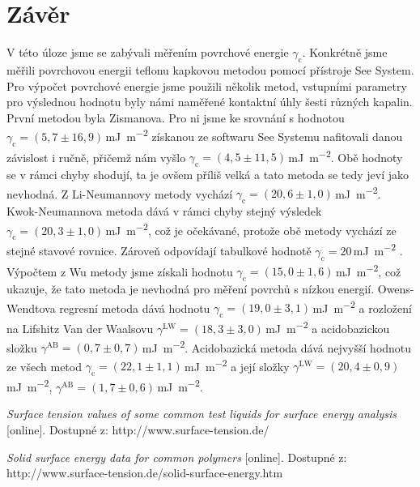 \documentclass{protokol}
\begin{document}
\section{Závěr}
V této úloze jsme se zabývali měřením povrchové energie  $\gamma_{\text{c}}$. 
Konkrétně jsme měřili povrchovou energii teflonu kapkovou metodou pomocí 
přístroje See System. Pro výpočet povrchové energie jsme použili několik metod, 
vstupními parametry pro výslednou hodnotu byly námi naměřené kontaktní úhly 
šesti různých kapalin. První metodou byla Zismanova. Pro ni jsme ke srovnání s 
hodnotou $\gamma_{\text{c}} = 
(5,7\pm16,9)$\,\si{\milli\joule\per\meter\squared} získanou ze softwaru See 
Systemu nafitovali danou závislost i ručně, přičemž nám vyšlo 
$\gamma_{\text{c}} = (4,5\pm11,5)$\,\si{\milli\joule\per\meter\squared}. Obě 
hodnoty se v rámci chyby shodují, ta je ovšem příliš velká a tato metoda se 
tedy jeví jako nevhodná. Z Li-Neumannovy metody vychází $\gamma_{\text{c}} = 
(20,6\pm1,0)$\,\si{\milli\joule\per\meter\squared}. Kwok-Neumannova metoda dává 
v rámci chyby stejný výsledek $\gamma_{\text{c}} = 
(20,3\pm1,0)$\,\si{\milli\joule\per\meter\squared}, což je očekávané, protože 
obě metody vychází ze stejné stavové rovnice. Zároveň odpovídají tabulkové 
hodnotě $\gamma_{\text{c}} = 20$\,\si{\milli\joule\per\meter\squared} 
\cite{napetiTeflon}. Výpočtem z Wu metody jsme získali hodnotu 
$\gamma_{\text{c}} = (15,0\pm1,6)$\,\si{\milli\joule\per\meter\squared}, což 
ukazuje, že tato metoda je nevhodná pro měření povrchů s nízkou energií. 
Owens-Wendtova regresní metoda dává hodnotu $\gamma_{\text{c}} = 
(19,0\pm3,1)$\,\si{\milli\joule\per\meter\squared} a rozložení na Lifshitz Van 
der Waalsovu $\gamma^\text{LW} = 
(18,3\pm3,0)$\,\si{\milli\joule\per\meter\squared} a acidobazickou složku
$\gamma^\text{AB} = (0,7\pm0,7)$\,\si{\milli\joule\per\meter\squared}. 
Acidobazická metoda dává nejvyšší hodnotu ze všech metod $\gamma_{\text{c}} = 
(22,1\pm1,1)$\,\si{\milli\joule\per\meter\squared} a její složky 
$\gamma^\text{LW} = (20,4\pm0,9)$\,\si{\milli\joule\per\meter\squared}, 
$\gamma^\text{AB} = (1,7\pm0,6)$\,\si{\milli\joule\per\meter\squared}.
\newpage
\begin{thebibliography}{10}
	 {\textit{Surface tension values of some common test 
	liquids for surface energy analysis} [online]. Dostupné z: 
	http://www.surface-tension.de/}
	
	 {\textit{Solid surface energy data for common polymers} [online]. Dostupné z: http://www.surface-tension.de/solid-surface-energy.htm}

	
\end{thebibliography}
\end{document}
